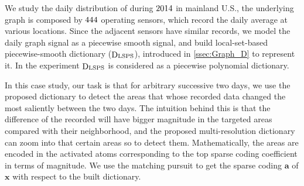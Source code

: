 \documentclass[journal,twocolumn,10pt]{IEEEtran}
\theoremstyle{definition}
\def\a{\mathbf{a}}
\def\x{\mathbf{x}}
\DeclareMathOperator{\D}{D}
\begin{document}
We study the daily distribution of  during ${\rm 2014}$ in mainland U.S., the underlying graph is composed by ${\rm 444}$ operating sensors, which record the daily average at various locations. Since the adjacent sensors have similar records, we model the daily graph signal as a piecewise smooth signal, and build local-set-based piecewise-smooth dictionary ($ \D_{\rm LSPS}$), introduced in \ref{ssec:Graph_D} to represent it. In the experiment $ \D_{\rm LSPS}$ is considered as a piecewise polynomial dictionary. 

In this case study, our task is that for arbitrary successive two days, we use the proposed dictionary to detect the areas that whose recorded data changed the most saliently between the two days. The intuition behind this is that the difference of the recorded  will have bigger magnitude in the targeted areas compared with their neighborhood, and the proposed multi-resolution dictionary can zoom into that certain areas so to detect them. Mathematically, the areas are encoded in the activated atoms corresponding to the top sparse coding coefficient in terms of magnitude. We use the matching pursuit to get the sparse coding $\a$ of $\x$ with respect to the built dictionary. 
\end{document}

